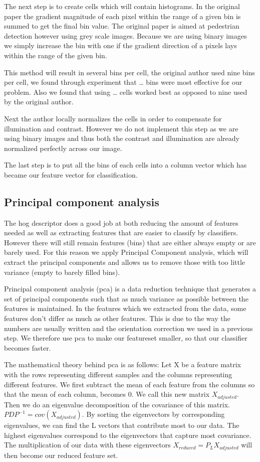 \documentclass[%
        compressed,
        final,
        notitlepage,
        narroweqnarray,
        inline,
        twoside,
        ]{ieee}
\begin{document}
The next step is to create cells which will contain histograms. In the original paper the gradient magnitude of each pixel within the range of a given bin is summed to get the final bin value. The original paper is aimed at pedestrian detection however using grey scale images. Because we are using binary images we simply increase the bin with one if the gradient direction of a pixels lays within the range of the given bin.

This method will result in several bins per cell, the original author used nine bins per cell, we found through experiment that … bins were most effective for our problem. Also we found that using … cells worked best as opposed to nine used by the original author.

Next the author locally normalizes the cells in order to compensate for illumination and contrast. However we do not implement this step as we are using binary images and thus both the contrast and illumination are already normalized perfectly across our image.

The last step is to put all the bins of each cells into a column vector which has became our feature vector for classification.


\subsection{Principal component analysis}
The hog descriptor does a good job at both reducing the amount of features needed as well as extracting features that are easier to classify by classifiers. However there will still remain features (bins) that are either always empty or are barely used. For this reason we apply Principal Component analysis, which will extract the principal components and allows us to remove those with too little variance (empty to barely filled bins).

Principal component analysis (pca) is a data reduction technique that generates a set of
principal components such that as much variance as possible between the features is maintained.  In the features which we extracted from the data, some features don't differ as much as other features. This is due to the way the numbers are usually written and the orientation correction we used in a previous step. We therefore use pca to make our featureset smaller, so that our classifier becomes faster.

The mathematical theory behind pca is as follows:
Let X be a feature matrix with the rows representing different samples and the
columns representing different features.  We first subtract the mean of each
feature from the columns so that the mean of each column, becomes 0. We call
this new matrix $X_{adjusted}$. Then we do an eigenvalue decomposition of the
covariance of this matrix. $PDP^{-1}=cov(X_{adjusted})$. By sorting the
eigenvectors by corresponding eigenvalues, we can find the L vectors that
contribute most to our data.  The highest eigenvalues correspond to the
eigenvectors that capture most covariance. The multiplication of our data with
these eigenvectors $X_{reduced}=P_L X_{adjusted}$ will then become our reduced feature set.
\end{document}
